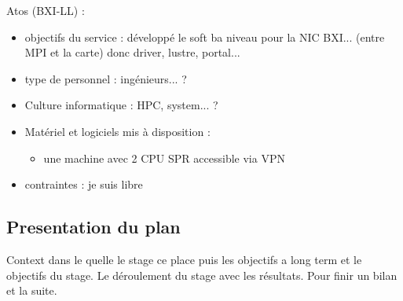 Atos (BXI-LL) :
\begin{itemize}
  \item objectifs du service : développé le soft ba niveau pour la NIC BXI... (entre MPI et la carte) donc driver, lustre, portal...
  \item type de personnel : ingénieurs... ?
  \item Culture informatique : HPC, system... ?
  \item Matériel et logiciels mis à disposition :
  \begin{itemize}
    \item une machine avec 2 CPU SPR accessible via VPN
  \end{itemize}
  \item contraintes : je suis libre
\end{itemize}

\subsection{Presentation du plan}

Context dans le quelle le stage ce place puis les objectifs a long term et le objectifs du stage.
Le déroulement du stage avec les résultats. Pour finir un bilan et la suite.
